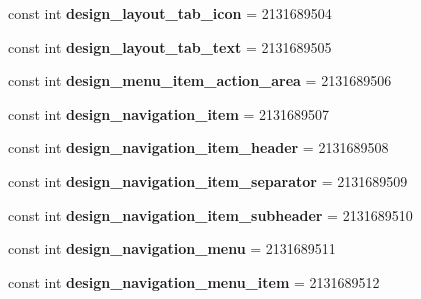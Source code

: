 \begin{DoxyCompactItemize}
const int {\bfseries design\+\_\+layout\+\_\+tab\+\_\+icon} = 2131689504
\item 
\mbox{\label{classst_delivery_1_1_resource_1_1_layout_a6c232146e1d26701c7d6284cb8733cc2}} 
const int {\bfseries design\+\_\+layout\+\_\+tab\+\_\+text} = 2131689505
\item 
\mbox{\label{classst_delivery_1_1_resource_1_1_layout_ae888d690a649d1583520b626e8856c39}} 
const int {\bfseries design\+\_\+menu\+\_\+item\+\_\+action\+\_\+area} = 2131689506
\item 
\mbox{\label{classst_delivery_1_1_resource_1_1_layout_a467c8d0ca0ef481d30cfd9bc3005b4ad}} 
const int {\bfseries design\+\_\+navigation\+\_\+item} = 2131689507
\item 
\mbox{\label{classst_delivery_1_1_resource_1_1_layout_aa7c003de0450da02969cc3e74818ffa2}} 
const int {\bfseries design\+\_\+navigation\+\_\+item\+\_\+header} = 2131689508
\item 
\mbox{\label{classst_delivery_1_1_resource_1_1_layout_aa312130f1d2af58b5da68c522d3f2df8}} 
const int {\bfseries design\+\_\+navigation\+\_\+item\+\_\+separator} = 2131689509
\item 
\mbox{\label{classst_delivery_1_1_resource_1_1_layout_a58095d83a36d354dc22efad916478a94}} 
const int {\bfseries design\+\_\+navigation\+\_\+item\+\_\+subheader} = 2131689510
\item 
\mbox{\label{classst_delivery_1_1_resource_1_1_layout_a28329bb73aeefc29e0744b00a49d0dc5}} 
const int {\bfseries design\+\_\+navigation\+\_\+menu} = 2131689511
\item 
\mbox{\label{classst_delivery_1_1_resource_1_1_layout_af3b83160651316ed83e44ede48aa26f6}} 
const int {\bfseries design\+\_\+navigation\+\_\+menu\+\_\+item} = 2131689512
\item 
\mbox{\label{classst_delivery_1_1_resource_1_1_layout_a934654dba30abecc5e6ac1a1d1549303}} 

\end{DoxyCompactItemize}
